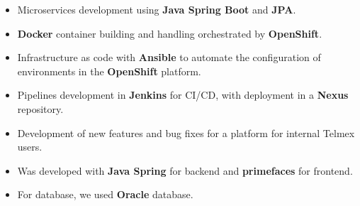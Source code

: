 \documentclass[letterpaper]{style} %
\begin{document}
\newpage %

\makeprofileSecond %

\begin{itemize}
	\item Microservices development using \textbf{Java Spring Boot} and \textbf{JPA}.
	\item \textbf{Docker} container building and handling orchestrated by \textbf{OpenShift}.
	\item Infrastructure as code with \textbf{Ansible} to automate the configuration of environments in the \textbf {OpenShift} platform.
	\item Pipelines development in \textbf{Jenkins} for CI/CD, with deployment in a \textbf{Nexus} repository.
\end{itemize}

\divider

\begin{itemize}
	\item Development of new features and bug fixes for a platform for internal Telmex users.
	\item Was developed with \textbf{Java Spring} for backend and \textbf{primefaces} for frontend.
	\item For database, we used \textbf{Oracle} database.
\end{itemize}


\end{document}

